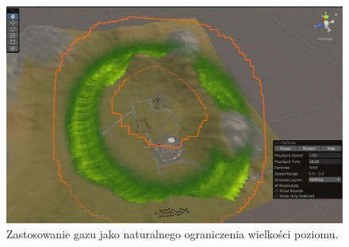 \begin{figure}[h]
        \centering
        \includegraphics[width=1\linewidth]{Images/gas.png}
        \caption{Zastosowanie gazu jako naturalnego ograniczenia wielkości poziomu.}
        \label{fig:enter-label}
\end{figure}

